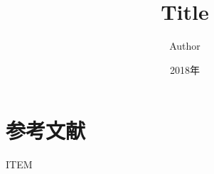 \documentclass[uplatex,a4paper,11pt]{jsarticle}
\title{Title}
\author{Author}
\date{2018年}
\begin{document}
\setlength{\abovedisplayskip}{-7pt}
\setlength{\belowdisplayskip}{5pt}
\maketitle
%

\section{参考文献}

\vspace{-3zh}
\begin{thebibliography}{99}
 ITEM
\end{thebibliography}
\end{document}
